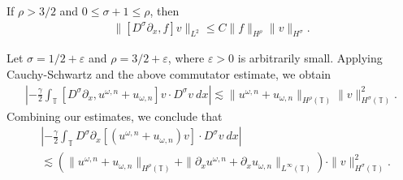 \documentclass{beamer}
\newcommand{\p}{\partial}
\newcommand{\ci}{\mathbb{T}}
\newcommand{\ee}{\varepsilon}
\begin{document}
%
%
\begin{frame}
\vskip0.1in
\begin{lemma}
\label{cor1}
If $\rho > 3/2$ and $0 \le \sigma + 1 \le \rho$, then
%
%
\begin{equation*}
\begin{split}
\|[D^\sigma \p_x ,f]v\|_{L^2} \le C \|f\|_{H^\rho} \|v\|_{H^\sigma}.
\label{15}
\end{split}
\end{equation*}
%
%
\end{lemma}
%
\pause
Let $\sigma = 1/2 + \ee$ and $\rho = 3/2 + \ee$, where 
$\ee > 0$ is
arbitrarily small. Applying Cauchy-Schwartz and the above commutator 
estimate, we obtain 
%
%
%
%
%
\begin{equation*}
\begin{split}
\left | -\frac{\gamma}{2} \int_{\ci} [D^\sigma \p_x , u^{\omega,n} + 
u_{\omega,n}]v
\cdot D^\sigma v \ dx \right | \lesssim \|u^{\omega,n} +
u_{\omega,n}\|_{H^{\rho}(\ci)} \|v\|_{H^\sigma(\ci)}^2.
\label{7}
\end{split}
\end{equation*}
%
%
\pause
Combining our estimates, we conclude that
%
%
\begin{equation*}
\begin{split}
& \left | -\frac{\gamma}{2} \int_{\ci} D^\sigma \p_x \left[ \left( 
u^{\omega,n} + u_{\omega,n}
\right)v \right]  \cdot D^\sigma v \ dx \right |
\\
& \lesssim (\|u^{\omega,n} + u_{\omega,n}\|_{H^{\rho}(\ci)} + \|\p_x 
u^{\omega,n} +
\p_x u_{\omega,n}\|_{L^\infty(\ci)} ) \cdot \|v\|_{H^\sigma(\ci)}^2.
\label{8}
\end{split}
\end{equation*}
%
%
%
\end{frame}
%
%
\end{document}
